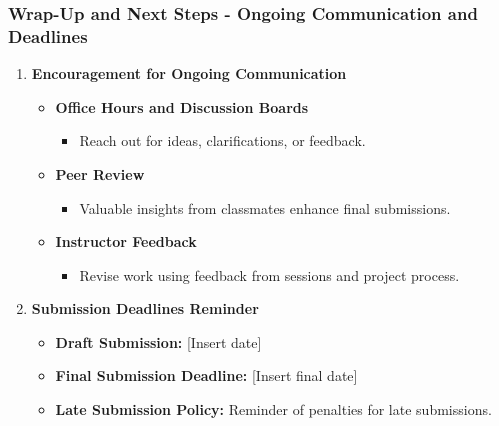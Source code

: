 \documentclass[aspectratio=169]{beamer}
\begin{document}
\begin{frame}[fragile]
    \frametitle{Wrap-Up and Next Steps - Ongoing Communication and Deadlines}
    \begin{enumerate}
        \item \textbf{Encouragement for Ongoing Communication}
        \begin{itemize}
            \item \textbf{Office Hours and Discussion Boards}
            \begin{itemize}
                \item Reach out for ideas, clarifications, or feedback.
            \end{itemize}
            \item \textbf{Peer Review}
            \begin{itemize}
                \item Valuable insights from classmates enhance final submissions.
            \end{itemize}
            \item \textbf{Instructor Feedback}
            \begin{itemize}
                \item Revise work using feedback from sessions and project process.
            \end{itemize}
        \end{itemize}
        
        \item \textbf{Submission Deadlines Reminder}
        \begin{itemize}
            \item \textbf{Draft Submission:} [Insert date]
            \item \textbf{Final Submission Deadline:} [Insert final date]
            \item \textbf{Late Submission Policy:} Reminder of penalties for late submissions.
        \end{itemize}
    \end{enumerate}
\end{frame}
\end{document}

